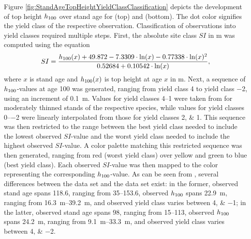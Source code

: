 Figure \ref{fig:StandAgeTopHeightYieldClassClassification} depicts the development of top height \(h_{100}\) over stand age for \Beech{} (top) and \Spruce{} (bottom).  The dot color signifies the yield class of the respective observation.  Classification of observations into yield classes required multiple steps.  First, the absolute site class \(SI\) in \si{\meter} was computed using the equation
\begin{equation}
  \label{eq:NagelFunctionSolvedForSI}
  SI = \frac{h_{100}(x) + 49.872 - 7.3309 \cdot \ln(x) - 0.77338 \cdot \ln(x)^2 }{0.52684 + 0.10542 \cdot \ln(x)} ,
\end{equation}
\parencite{Nagel1999} where \(x\) is stand age and \(h_{100}(x)\) is top height at age \(x\) in \si{\meter}.  Next, a sequence of \(h_{100}{}\)-values at age \SI{100}{\years} was generated, ranging from yield class \num{4} to yield class \num{-2}, using an increment of \SI{0.1}{\meter}.  Values for yield classes \numrange{4}{1} were taken from \textcite{Schober1995} for moderately thinned stands of the respective species, while values for yield classes \numrange{0}{-2} were linearly interpolated from those for yield classes \numlist{2; 1}.  This sequence was then restricted to the range between the best yield class needed to include the lowest observed \(SI\)-value and the worst yield class needed to include the highest observed \(SI\)-value.  A color palette matching this restricted sequence was then generated, ranging from red (worst yield class) over yellow and green to blue (best yield class).  Each observed \(SI\)-value was then mapped to the color representing the corresponding \(h_{100}{}\)-value.  As can be seen from , several differences between the \Beech{} data set and the \Spruce{} data set exist:
in the former, observed stand age spans \SI{118.6}{\years}, ranging from \SIrange{35}{153.6}{\years}, observed \(h_{100}{}\) spans \SI{22.9}{\meter}, ranging from \SIrange{16.3}{39.2}{\meter}, and observed yield class varies between \numlist{4; -1};
in the latter, observed stand age spans \SI{98}{\years}, ranging from \SIrange{15}{113}{\years}, observed \(h_{100}{}\) spans \SI{24.2}{\meter}, ranging from \SIrange{9.1}{33.3}{\meter}, and observed yield class varies between \numlist{4; -2}.

